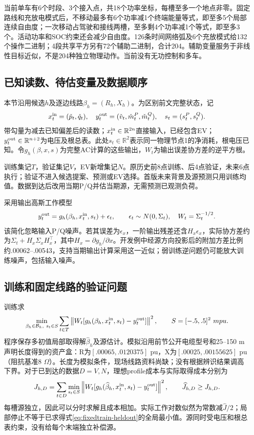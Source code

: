 \documentclass[UTF8,fontset=fandol,11pt,a4paper]{ctexart}
\newcommand{\R}{\mathbb R}
\newcommand{\norm}[1]{\left\lVert#1\right\rVert}
\begin{document}
当前单车有6个时段、3个接入点，共18个功率坐标，每槽至多一个地点非零。固定路线和充放电模式后，不移动最多有6个功率减1个终端能量等式，即至多5个局部连续自由度；一次移动占驾驶和接线两槽，至多剩4个功率减1个等式，即至多3个。活动功率和SOC约束还会减少自由度。126条时间网络弧及6个充放模式给132个操作二进制；4段共享平方另有72个辅助二进制，合计204。辅助变量服务于非线性目标近似，不是204种独立物理动作。当前没有无功控制和多车。

\subsection{已知读数、待估变量及数据顺序}
本节沿用候选$h$及逐边线路$\beta_h=(R_h,X_h)$。为区别前文完整状态，记
\[
 x_t^{\rm in}=(\check p_t,\check q_t),\quad
 y_t^{\rm out}=(\check v_t,\check m_t^P,\check m_t^Q),\quad
 s_t=(s_t^P,s_t^Q).
\]
带勾量为减去已知偏差后的读数；$x_t^{\rm in}\in\R^{2n}$直接输入，已经包含EV；$y_t^{\rm out}\in\R^{n+2}$为电压及根总表。此处$s_t\in\R^2$表示同一物理节点1的净消耗，根电压已知。令$g_h(\beta,x,s)$为完整AC计算的这些输出，$W_t$为输出误差协方差的逆平方根。

训练集记$T$，验证集记$V$，EV新增集记$N$。原历史前8点训练、后4点验证，未来6点执行；验证不进入候选提案、预测或EV选择。首版未来背景及源预测只用训练均值。数据到达后改用当期P/Q并估当期源，无需预测已观测负荷。

采用输出高斯工作模型
\begin{equation}
 y_t^{\rm out}=g_h(\beta_h,x_t^{\rm in},s_t)+\epsilon_t,
 \qquad \epsilon_t\sim N(0,\Sigma_t),\quad W_t=\Sigma_t^{-1/2}.
 \label{eq:fixedtrain-working-model}
\end{equation}
该简化忽略输入P/Q噪声。若其误差为$\epsilon_x$，一阶输出残差还含$H_x\epsilon_x$，实际协方差约为$\Sigma_t+H_x\Sigma_xH_x^\top$，其中$H_x=\partial g_h/\partial x$。开发例中经源方向投影后的附加方差比例约.00062--.00543，支持当期输出计算采用这一近似；弱训练逆问题仍可能放大训练噪声，包括输入噪声。

\subsection{训练和固定线路的验证问题}
训练求
\begin{equation}
 \min_{\beta_h\in\mathcal B_h,\ s_t\in S}
 \sum_{t\in T}\norm{W_t[g_h(\beta_h,x_t^{\rm in},s_t)-y_t^{\rm out}]}^2,
 \qquad S=[-.5,.5]^2\ {
m pu}.
 \label{eq:fixedtrain-training}
\end{equation}
程序保存多初值局部取得解$\widehat\beta_h$及源估计。模拟沿用前节公开电缆型号和25--150 m声明长度得到的资产盒：R为$[.00065,.0120375]$ pu，X为$[.00025,.00155625]$ pu（阻抗基准8 $\Omega$）。长度为模拟条件，现场线路资料尚缺；没有根据辨识结果调高下界。对于已到达的数据$D=V,N$，理想profile成本与实际取得成本分别为
\begin{equation}
 J_{h,D}=\sum_{t\in D}\min_{s_t\in S}
 \norm{W_t[g_h(\widehat\beta_h,x_t^{\rm in},s_t)-y_t^{\rm out}]}^2,
 \qquad \widehat J_{h,D}\ge J_{h,D}.
 \label{eq:fixedtrain-heldout}
\end{equation}
每槽源独立，因此可以分时求解且成本相加。实际工作对数似然为常数减$\widehat J/2$；局部停止不等于已求得式\eqref{eq:fixedtrain-heldout}的全局最小值。源同时受电压和根总表约束，没有给每个末端独立补偿源。
\end{document}

